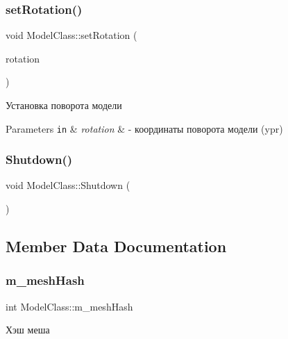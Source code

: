 \subsubsection{\texorpdfstring{set\+Rotation()}{setRotation()}}
{\footnotesize\ttfamily void Model\+Class\+::set\+Rotation (\begin{DoxyParamCaption}\item[{D3\+D\+X\+V\+E\+C\+T\+O\+R3}]{rotation }\end{DoxyParamCaption})}



Установка поворота модели 


\begin{DoxyParams}[1]{Parameters}
\mbox{\tt in}  & {\em rotation} & -\/ координаты поворота модели (ypr) \\
\hline
\end{DoxyParams}
\mbox{\label{class_model_class_a958ab747453c56b221525330e0cc7f18}} 
\subsubsection{\texorpdfstring{Shutdown()}{Shutdown()}}
{\footnotesize\ttfamily void Model\+Class\+::\+Shutdown (\begin{DoxyParamCaption}{ }\end{DoxyParamCaption})}



\subsection{Member Data Documentation}
\mbox{\label{class_model_class_ad93a0cca424771ab37024e5d2ec7268f}} 
\subsubsection{\texorpdfstring{m\+\_\+mesh\+Hash}{m\_meshHash}}
{\footnotesize\ttfamily int Model\+Class\+::m\+\_\+mesh\+Hash\hspace{0.3cm}{\ttfamily [private]}}



Хэш меша 

